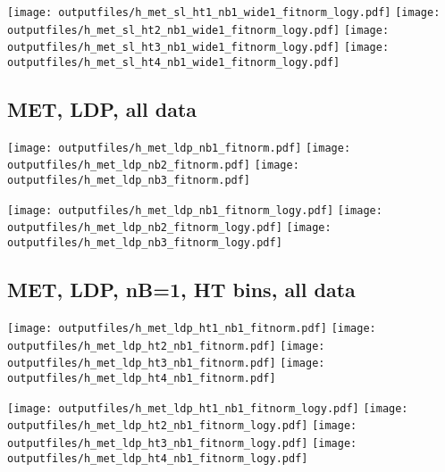 \documentclass[11pt]{article}
\begin{document}
    \noindent
     \texttt{[image: outputfiles/h\_met\_sl\_ht1\_nb1\_wide1\_fitnorm\_logy.pdf]}
     \texttt{[image: outputfiles/h\_met\_sl\_ht2\_nb1\_wide1\_fitnorm\_logy.pdf]}
     \texttt{[image: outputfiles/h\_met\_sl\_ht3\_nb1\_wide1\_fitnorm\_logy.pdf]}
     \texttt{[image: outputfiles/h\_met\_sl\_ht4\_nb1\_wide1\_fitnorm\_logy.pdf]}


     \clearpage


    \subsection{ MET, LDP, all data}

    \noindent
     \texttt{[image: outputfiles/h\_met\_ldp\_nb1\_fitnorm.pdf]}
     \texttt{[image: outputfiles/h\_met\_ldp\_nb2\_fitnorm.pdf]}
     \texttt{[image: outputfiles/h\_met\_ldp\_nb3\_fitnorm.pdf]}

    \noindent
     \texttt{[image: outputfiles/h\_met\_ldp\_nb1\_fitnorm\_logy.pdf]}
     \texttt{[image: outputfiles/h\_met\_ldp\_nb2\_fitnorm\_logy.pdf]}
     \texttt{[image: outputfiles/h\_met\_ldp\_nb3\_fitnorm\_logy.pdf]}


     \subsection{ MET, LDP, nB=1, HT bins, all data}

    \noindent
     \texttt{[image: outputfiles/h\_met\_ldp\_ht1\_nb1\_fitnorm.pdf]}
     \texttt{[image: outputfiles/h\_met\_ldp\_ht2\_nb1\_fitnorm.pdf]}
     \texttt{[image: outputfiles/h\_met\_ldp\_ht3\_nb1\_fitnorm.pdf]}
     \texttt{[image: outputfiles/h\_met\_ldp\_ht4\_nb1\_fitnorm.pdf]}

    \noindent
     \texttt{[image: outputfiles/h\_met\_ldp\_ht1\_nb1\_fitnorm\_logy.pdf]}
     \texttt{[image: outputfiles/h\_met\_ldp\_ht2\_nb1\_fitnorm\_logy.pdf]}
     \texttt{[image: outputfiles/h\_met\_ldp\_ht3\_nb1\_fitnorm\_logy.pdf]}
     \texttt{[image: outputfiles/h\_met\_ldp\_ht4\_nb1\_fitnorm\_logy.pdf]}


    \clearpage
\end{document}
